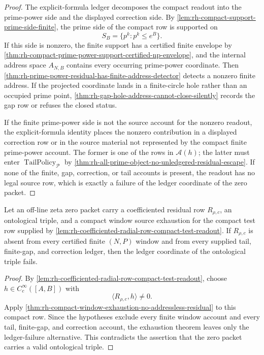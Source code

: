 \begin{proof}
The explicit-formula ledger decomposes the compact readout into the
prime-power side and the displayed correction side.  By
\autoref{lem:rh-compact-support-prime-side-finite}, the prime side of
the compact row is supported on
$$
S_B=\{p^k:p^k\le e^B\}.
$$
If this side is nonzero, the finite support has a certified finite
envelope by
\autoref{thm:rh-compact-prime-power-support-certified-np-envelope}, and
the internal address space $A_{N,B}$ contains every occurring
prime-power coordinate.  Then
\autoref{thm:rh-prime-power-residual-has-finite-address-detector}
detects a nonzero finite address.  If the projected coordinate lands in
a finite-circle hole rather than an occupied prime point,
\autoref{thm:rh-gap-hole-address-cannot-close-silently} records the
gap row or refuses the closed status.

If the finite prime-power side is not the source account for the
nonzero readout, the explicit-formula identity places the nonzero
contribution in a displayed correction row or in the source material
not represented by the compact finite prime-power account.  The former
is one of the rows in $\mathcal A(h)$; the latter must enter
$\operatorname{TailPolicy}_{\mathcal P}$ by
\autoref{thm:rh-all-prime-object-no-unledgered-residual-escape}.
If none of the finite, gap, correction, or tail accounts is present,
the readout has no legal source row, which is exactly a failure of the
ledger coordinate of the zero packet.
\end{proof}

\begin{theorem}
\label{thm:rh-global-finite-window-bridge-contrapositive}
Let an off-line zeta zero packet carry a coefficiented residual row
$R_{\rho,c}$, an ontological triple, and a compact window source
exhaustion for the compact test row supplied by
\autoref{lem:rh-coefficiented-radial-row-compact-test-readout}.  If
$R_{\rho,c}$ is absent from every certified finite $(N,P)$ window and
from every supplied tail, finite-gap, and correction ledger, then the
ledger coordinate of the ontological triple fails.
\end{theorem}

\begin{proof}
By
\autoref{lem:rh-coefficiented-radial-row-compact-test-readout}, choose
$h\in C_c^\infty([A,B])$ with
$$
\langle R_{\rho,c},h\rangle\ne0.
$$
Apply
\autoref{thm:rh-compact-window-exhaustion-no-addressless-residual} to
this compact row.  Since the hypotheses exclude every finite window
account and every tail, finite-gap, and correction account, the
exhaustion theorem leaves only the ledger-failure alternative.  This
contradicts the assertion that the zero packet carries a valid
ontological triple.
\end{proof}

